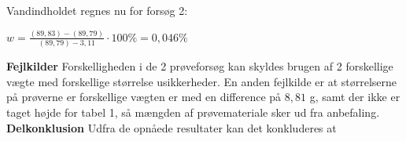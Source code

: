 Vandindholdet regnes nu for forsøg 2:
\begin{center}
	$w=\frac{(89,\!83)-(89,\!79)}{(89,\!79)-3,\!11}\cdot100\%=0,\!046\%$
\end{center}

\textbf{Fejlkilder}
\newline
Forskelligheden i de 2 prøveforsøg kan skyldes brugen af 2 forskellige vægte med forskellige størrelse usikkerheder. En anden fejlkilde er at størrelserne på prøverne er forskellige vægten er med en difference på $8,\!81$ g, samt der ikke er taget højde for tabel 1, så mængden af prøvemateriale sker ud fra anbefaling.
\newline
\newline
\textbf{Delkonklusion}
\newline
Udfra de opnåede resultater kan det konkluderes at 